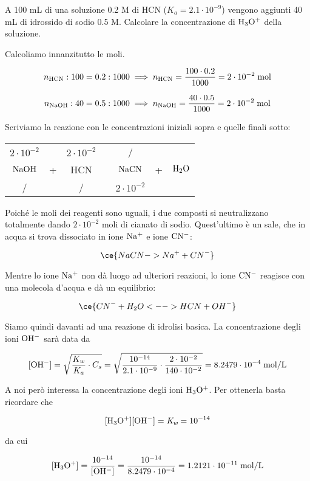 \begin{esercizio}
    A 100 mL di una soluzione 0.2 M di HCN ($K_a=2.1 \cdot 10^{-9}$) vengono aggiunti 40 mL di idrossido di sodio 0.5 M. Calcolare la concentrazione di $\rm H_3O^+$ della soluzione.
\end{esercizio}
\begin{soluzione}
    Calcoliamo innanzitutto le moli.

$$n_{\rm HCN}:100=0.2:1000
\implies
n_{\rm HCN}=\frac{100 \cdot 0.2}{1000}=2 \cdot 10^{-2} \; \rm mol$$

$$n_{\rm NaOH}:40=0.5:1000
\implies
n_{\rm NaOH}=\frac{40 \cdot 0.5}{1000}=2 \cdot 10^{-2} \; \rm mol$$

Scriviamo la reazione con le concentrazioni iniziali sopra e quelle finali sotto:

\begin{center}
    \begin{tabular}{ccccccc}
        $2 \cdot 10^{-2}$ &  & $2 \cdot 10^{-2}$ & & / &&\\
        $\rm NaOH$ & + & HCN & \ce{->} & $\rm NaCN$ & + & $\rm H_2O$\\
        / &  &  / & & $2 \cdot 10^{-2}$ &&\\
    \end{tabular}
\end{center}

Poiché le moli dei reagenti sono uguali, i due composti si neutralizzano totalmente dando $2 \cdot 10^{-2}$ moli di cianato di sodio. Quest'ultimo è un sale, che in acqua si trova dissociato in ione $\rm Na^+$ e ione $\rm CN^-$:

$$\ce{NaCN -> Na^+ + CN^-}$$

Mentre lo ione $\rm Na^+$ non dà luogo ad ulteriori reazioni, lo ione $\rm CN^-$ reagisce con una molecola d'acqua e dà un equilibrio:

$$\ce{CN^- + H_2O <--> HCN + OH^-}$$

Siamo quindi davanti ad una reazione di idrolisi basica. La concentrazione degli ioni $\rm OH^-$ sarà data da

$$[\text{OH}^-]
=\sqrt{\frac{K_w}{K_a}\cdot C_s}
=\sqrt{\frac{10^{-14}}{2.1 \cdot 10^{-9}} \cdot \frac{2 \cdot 10^{-2}}{140 \cdot 10^{-2}}}
=8.2479 \cdot 10^{-4} \; \rm mol/L$$

A noi però interessa la concentrazione degli ioni $\rm H_3O^+$. Per ottenerla basta ricordare che

$$\rm [H_3O^+][OH^-]=\textit{K}_{\textit{w}}=10^{-14}$$

da cui

$$\rm [H_3O^+]
=\frac{10^{-14}}{[OH^-]}
=\frac{10^{-14}}{8.2479 \cdot 10^{-4}}=1.2121 \cdot 10^{-11} \; \rm mol/L$$
\end{soluzione}


